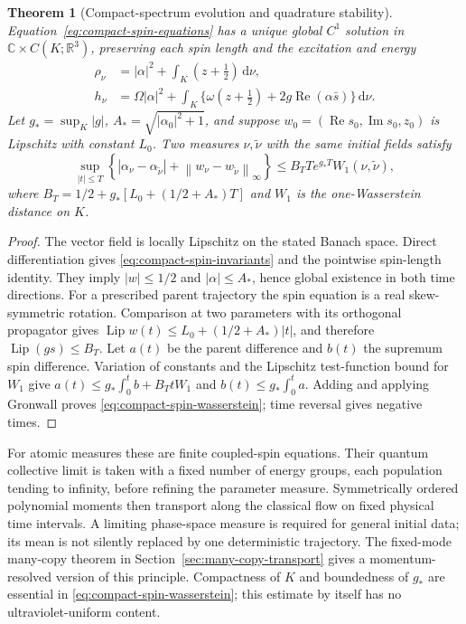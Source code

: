 \documentclass[11pt,a4paper,oneside]{book}
\theoremstyle{plain}
\newtheorem{theorem}{Theorem}[chapter]
\theoremstyle{definition}
\theoremstyle{remark}
\newcommand{\R}{\mathbb R}
\newcommand{\C}{\mathbb C}
\newcommand{\dd}{\mathrm d}
\newcommand{\norm}[1]{\left\lVert#1\right\rVert}
\newcommand{\src}[2]{\cite{#1}}
\begin{document}
\begin{theorem}[Compact-spectrum evolution and quadrature stability]
\label{thm:compact-spin-quadrature}
Equation~\eqref{eq:compact-spin-equations} has a unique global
$C^1$ solution in $\C\times C(K;\R^3)$, preserving each spin length
and the excitation and energy
\begin{equation}
 \begin{split}
 \rho_\nu&=|\alpha|^2+\int_K(z+\tfrac12)\,\dd\nu,\\
 h_\nu&=\Omega|\alpha|^2+
 \int_K\{\omega(z+\tfrac12)+2g\operatorname{Re}(\alpha\bar s)\}\,\dd\nu.
 \end{split}
 \label{eq:compact-spin-invariants}
\end{equation}
Let $g_* =\sup_K|g|$, $A_* =\sqrt{|\alpha_0|^2+1}$, and suppose
$w_0=(\operatorname{Re}s_0,\operatorname{Im}s_0,z_0)$ is Lipschitz
with constant $L_0$.  Two measures $\nu,\widetilde\nu$ with the same
initial fields satisfy
\begin{equation}
 \sup_{|t|\le T}\left\{|\alpha_\nu-\alpha_{\widetilde\nu}|+
                \norm{w_\nu-w_{\widetilde\nu}}_\infty\right\}
 \le B_TTe^{g_*T}W_1(\nu,\widetilde\nu),
 \label{eq:compact-spin-wasserstein}
\end{equation}
where $B_T=1/2+g_*[L_0+(1/2+A_*)T]$ and $W_1$ is the
one-Wasserstein distance on $K$.
\end{theorem}
\begin{proof}
The vector field is locally Lipschitz on the stated Banach space.
Direct differentiation gives \eqref{eq:compact-spin-invariants} and
the pointwise spin-length identity.  They imply
$|w|\le1/2$ and $|\alpha|\le A_*$, hence global existence in both
time directions.  For a prescribed parent trajectory the spin equation
is a real skew-symmetric rotation.  Comparison at two parameters with
its orthogonal propagator gives
$\operatorname{Lip}w(t)\le L_0+(1/2+A_*)|t|$, and therefore
$\operatorname{Lip}(gs)\le B_T$.  Let $a(t)$ be the parent difference
and $b(t)$ the supremum spin difference.  Variation of constants and
the Lipschitz test-function bound for $W_1$ give
$a(t)\le g_*\int_0^t b+B_TtW_1$ and
$b(t)\le g_*\int_0^t a$.  Adding and applying Gronwall proves
\eqref{eq:compact-spin-wasserstein}; time reversal gives negative times.
\end{proof}
\src{R20}{thm:v20v63-global,lem:v20v63-lipschitz,thm:v20v63-stability}

For atomic measures these are finite coupled-spin equations.  Their
quantum collective limit is taken with a fixed number of energy
groups, each population tending to infinity, before refining the
parameter measure.  Symmetrically ordered polynomial moments then
transport along the classical flow on fixed physical time intervals.
A limiting phase-space measure is required for general initial data;
its mean is not silently replaced by one deterministic trajectory.
The fixed-mode many-copy theorem in
Section~\ref{sec:many-copy-transport} gives a momentum-resolved version
of this principle.  Compactness of $K$ and boundedness of $g_*$ are
essential in \eqref{eq:compact-spin-wasserstein}; this estimate by itself
has no ultraviolet-uniform content.
\src{R20}{thm:v20v61-transport,thm:v20v62-transport,cor:v20v63-sequential}
\end{document}
